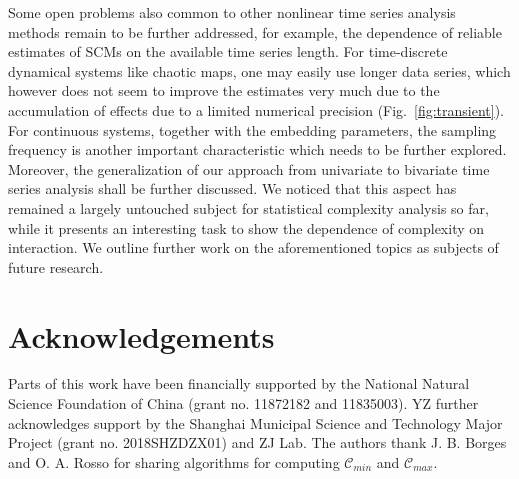 \documentclass[12pt,aip,cha,reprint,nofootinbib]{revtex4-1}
\begin{document}
Some open problems also common to other nonlinear time series analysis methods remain to be further addressed, for example, the dependence of reliable estimates of SCMs on the available time series length. For time-discrete dynamical systems like chaotic maps, one may easily use longer data series, which however does not seem to improve the estimates very much due to the accumulation of effects due to a limited numerical precision (Fig.~\ref{fig:transient}). For continuous systems, together with the embedding parameters, the sampling frequency is another important characteristic which needs to be further explored. Moreover, the generalization of our approach from univariate to bivariate time series analysis shall be further discussed. We noticed that this aspect has remained a largely untouched subject for statistical complexity analysis so far, while it presents an interesting task to show the dependence of complexity on interaction. We outline further work on the aforementioned topics as subjects of future research.

\section*{Acknowledgements}
Parts of this work have been financially supported by the National Natural Science Foundation of China (grant no. 11872182 and 11835003). YZ further acknowledges support by the Shanghai Municipal Science and Technology Major Project (grant no. 2018SHZDZX01) and ZJ Lab. The authors thank J. B. Borges and O. A. Rosso for sharing algorithms for computing $\mathcal{C}_{min}$ and $\mathcal{C}_{max}$. 



\end{document}
